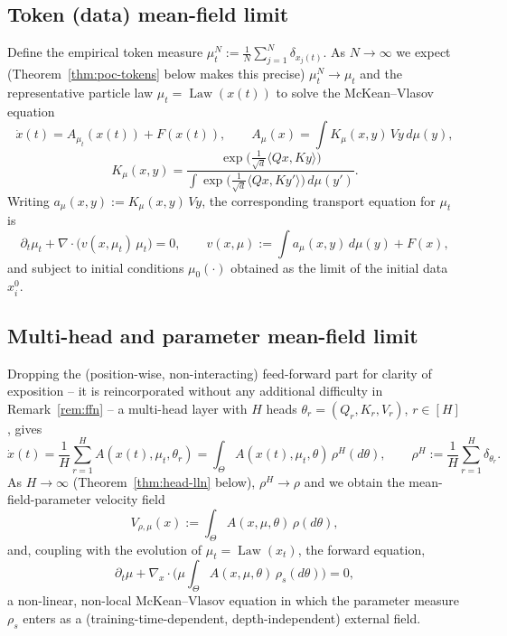 \documentclass[11pt,a4wide]{article}
\theoremstyle{definition}
\DeclareMathOperator{\Law}{Law}
\begin{document}
\subsection{Token (data) mean-field limit}
Define the empirical token measure $\mu_t^N := \tfrac1N\sum_{j=1}^N\delta_{x_j(t)}$. As $N\to\infty$ we expect (Theorem~\ref{thm:poc-tokens} below makes this precise) $\mu_t^N \to \mu_t$ and the representative particle law $\mu_t=\Law(x(t))$ to solve the McKean--Vlasov equation
\begin{equation}
\dot x(t) = A_{\mu_t}(x(t)) + F(x(t)), \qquad
A_\mu(x) = \int K_\mu(x,y)\,Vy\,d\mu(y),
\label{eq:mv-token}
\end{equation}
\begin{equation}
K_\mu(x,y) = \frac{\exp\big(\tfrac1{\sqrt d}\langle Qx,Ky\rangle\big)}{\int \exp\big(\tfrac1{\sqrt d}\langle Qx,Ky'\rangle\big)\,d\mu(y')}.
\label{eq:kernel}
\end{equation}
Writing $a_\mu(x,y) := K_\mu(x,y)\,Vy$, the corresponding transport equation for $\mu_t$ is
\begin{equation}
\partial_t\mu_t + \nabla\cdot\big(v(x,\mu_t)\,\mu_t\big) = 0, \qquad v(x,\mu) := \int a_\mu(x,y)\,d\mu(y) + F(x), 
\label{eq:token-pde}
\end{equation}
and subject to initial conditions $\mu_0(\cdot)$ obtained as the limit of the initial data $x_i^0$.

\subsection{Multi-head and parameter mean-field limit}
Dropping the (position-wise, non-interacting) feed-forward part for clarity of exposition -- it is reincorporated without any additional difficulty in Remark~\ref{rem:ffn} -- a multi-head layer with $H$ heads $\theta_r=(Q_r,K_r,V_r)$, $r\in[H]$, gives
\begin{equation}
\dot x(t) = \frac1H\sum_{r=1}^H A(x(t),\mu_t, \theta_r) = \int_\Theta A(x(t),\mu_t,\theta)\,\rho^H(d\theta), \qquad \rho^H := \frac1H\sum_{r=1}^H \delta_{\theta_r}.
\label{eq:multihead}
\end{equation}
As $H\to\infty$ (Theorem~\ref{thm:head-lln} below), $\rho^H\to\rho$ and we obtain the mean-field-parameter velocity field
\begin{equation}
V_{\rho,\mu}(x) := \int_\Theta A(x,\mu,\theta)\,\rho(d\theta),
\label{eq:V}
\end{equation}
and, coupling with the evolution of $\mu_t=\Law(x_t)$, the forward equation,
\begin{equation}
\partial_t\mu + \nabla_x\cdot\Big(\mu\int_\Theta A(x,\mu,\theta)\,\rho_s(d\theta)\Big) = 0,
\label{eq:forward-coupled}
\end{equation}
a non-linear, non-local McKean--Vlasov equation in which the parameter measure $\rho_s$ enters as a (training-time-dependent, depth-independent) external field.
\end{document}
